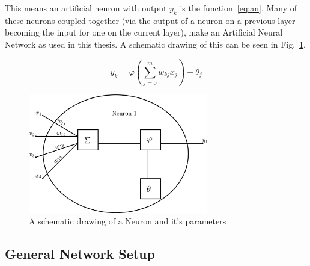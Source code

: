 This means an artificial neuron with output \(y_k\) is the function~\ref{eq:an}. Many of these neurons coupled together (via the output of a neuron on a previous layer becoming the input for one on the current layer), make an Artificial Neural Network as used in this thesis. A schematic drawing of this can be seen in Fig.~\ref{fig:neuron}.

\begin{equation}
y_k = \varphi(\sum_{j=0}^{m} w_{kj}x_j) - \theta_j
\label{eq:an}
\end{equation}

\begin{figure}[h!]
\label{fig:neuron}
\caption{A schematic drawing of a Neuron and it's parameters}
\centering
\includegraphics[width=0.7\textwidth]{images/neuron.png}
\end{figure}

\subsection{General Network Setup}
\label{sec:fund:netSetup}

